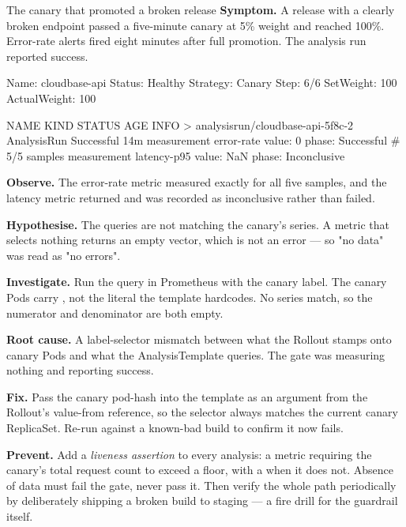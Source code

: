 \begin{debuglab}{The canary that promoted a broken release}
\textbf{Symptom.} A release with a clearly broken endpoint passed a five-minute canary at 5\% weight and reached 100\%. Error-rate alerts fired eight minutes after full promotion. The analysis run reported success.

\begin{outbox}
Name:            cloudbase-api
Status:          Healthy
Strategy:        Canary
  Step:          6/6
  SetWeight:     100
  ActualWeight:  100

NAME                          KIND         STATUS      AGE  INFO
> analysisrun/cloudbase-api-5f8c-2  AnalysisRun  Successful  14m
    measurement error-rate    value: 0     phase: Successful  # 5/5 samples
    measurement latency-p95   value: NaN   phase: Inconclusive
\end{outbox}

\begin{tickcheck}
  \item \textbf{Observe.} The error-rate metric measured exactly  for all five samples, and the latency metric returned  and was recorded as inconclusive rather than failed.
  \item \textbf{Hypothesise.} The queries are not matching the canary's series. A metric that selects nothing returns an empty vector, which is not an error --- so "no data" was read as "no errors".
  \item \textbf{Investigate.} Run the query in Prometheus with the canary label. The canary Pods carry , not the literal  the template hardcodes. No series match, so the numerator and denominator are both empty.
  \item \textbf{Root cause.} A label-selector mismatch between what the Rollout stamps onto canary Pods and what the AnalysisTemplate queries. The gate was measuring nothing and reporting success.
  \item \textbf{Fix.} Pass the canary pod-hash into the template as an argument from the Rollout's value-from reference, so the selector always matches the current canary ReplicaSet. Re-run against a known-bad build to confirm it now fails.
  \item \textbf{Prevent.} Add a \emph{liveness assertion} to every analysis: a metric requiring the canary's total request count to exceed a floor, with a  when it does not. Absence of data must fail the gate, never pass it. Then verify the whole path periodically by deliberately shipping a broken build to staging --- a fire drill for the guardrail itself.
\end{tickcheck}
\end{debuglab}

